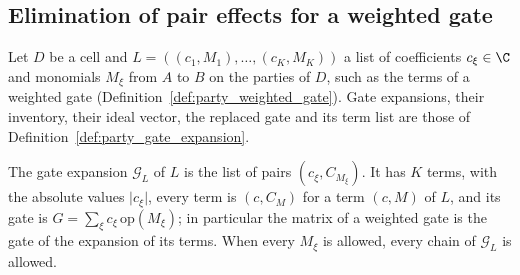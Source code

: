 \subsection{Elimination of pair effects for a weighted gate}
\label{sec:party_weighted_elimination}

Let $D$ be a cell and $L=((c_1,M_1),\dots,(c_K,M_K))$ a list of coefficients
$c_\xi\in\C$ and monomials $M_\xi$ from $A$ to $B$ on the parties of $D$, such as the
terms of a weighted gate (Definition~\ref{def:party_weighted_gate}). Gate
expansions, their inventory, their ideal vector, the replaced gate and its term
list are those of Definition~\ref{def:party_gate_expansion}.

\begin{definition}
    \label{def:party_weighted_expansion}
    \leanok
    The gate expansion $\mathcal G_L$ of $L$ is the list of pairs $(c_\xi,C_{M_\xi})$.
    It has $K$ terms, with the absolute values $\lvert c_\xi\rvert$, every term is
    $(c,C_M)$ for a term $(c,M)$ of $L$, and its gate is
    $G=\sum_\xi c_\xi\,\mathrm{op}(M_\xi)$; in particular the matrix of a weighted
    gate is the gate of the expansion of its terms. When every $M_\xi$ is allowed,
    every chain of $\mathcal G_L$ is allowed.
\end{definition}

